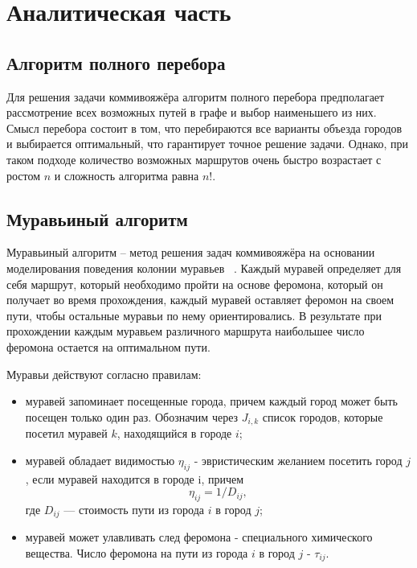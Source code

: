 \section{Аналитическая часть}

\subsection{Алгоритм полного перебора}

Для решения задачи коммивояжёра алгоритм полного перебора предполагает рассмотрение всех возможных путей в графе и выбор наименьшего из них. Смысл перебора состоит в том, что перебираются все варианты объезда городов и выбирается оптимальный, что гарантирует точное решение задачи. Однако, при таком подходе количество возможных маршрутов очень быстро возрастает с ростом $n$ и сложность алгоритма равна $n!$.

\subsection{Муравьиный алгоритм}
Муравьиный алгоритм -- метод решения задач коммивояжёра на основании моделирования поведения колонии муравьев ~\cite{mur}. Каждый муравей определяет для себя маршрут, который необходимо пройти на основе феромона, который он получает во время прохождения, каждый муравей оставляет феромон на своем пути, чтобы остальные муравьи по нему ориентировались. В результате при прохождении каждым муравьем различного маршрута наибольшее число феромона остается на оптимальном пути.

Муравьи действуют согласно правилам:
\begin{itemize}[label*=---]
	\item муравей запоминает посещенные города, причем каждый город может быть посещен только один раз. Обозначим через $J_{i,k}$ список городов, которые посетил муравей $k$, находящийся в городе $i$;
	\item муравей обладает видимостью $\eta_{ij}$ - эвристическим желанием посетить город $j$, если муравей находится в городе i, причем
	\begin{equation}
		\label{d_func}
		\eta_{ij} = 1 / D_{ij},
	\end{equation}
	где $D_{ij}$ — стоимость пути из города $i$ в город $j$;
	\item муравей может улавливать след феромона - специального химического вещества. Число феромона на пути из города $i$ в город $j$ - $\tau_{ij}$.
\end{itemize}

